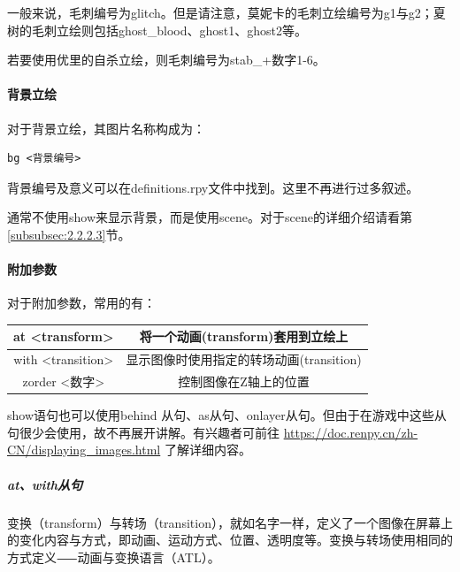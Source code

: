 \documentclass[../../Main.tex]{subfiles}
\begin{document}
一般来说，毛刺编号为glitch。但是请注意，莫妮卡的毛刺立绘编号为g1与g2；夏树的毛刺立绘则包括ghost\_blood、ghost1、ghost2等。

若要使用优里的自杀立绘，则毛刺编号为stab\_+数字1-6。

\paragraph{背景立绘}

对于背景立绘，其图片名称构成为：
\begin{lstlisting}
bg <背景编号>
\end{lstlisting}

背景编号及意义可以在definitions.rpy文件中找到。这里不再进行过多叙述。

\begin{ExtraKnowledge}
通常不使用show来显示背景，而是使用scene。对于scene的详细介绍请看第\ref{subsubsec:2.2.2.3}节。
\end{ExtraKnowledge}

\paragraph{附加参数}

对于附加参数，常用的有：
\begin{center}
    \tabletail{\hline}
    \tablelasttail{\hline}
    \begin{supertabular}{|c|c|}
        \hline
        at <transform> & 将一个动画(transform)套用到立绘上\\
        \hline
        with <transition> & 显示图像时使用指定的转场动画(transition)\\
        \hline
        zorder <数字> & 控制图像在Z轴上的位置\\
        \hline
    \end{supertabular}
\end{center}

\begin{ExtraKnowledge}
show语句也可以使用behind 从句、as从句、onlayer从句。但由于在游戏中这些从句很少会使用，故不再展开讲解。有兴趣者可前往 \url{https://doc.renpy.cn/zh-CN/displaying_images.html} 了解详细内容。
\end{ExtraKnowledge}

\subparagraph{at、with从句}
\label{subsubsec:2.2.2.1}

变换（transform）与转场（transition），就如名字一样，定义了一个图像在屏幕上的变化内容与方式，即动画、运动方式、位置、透明度等。变换与转场使用相同的方式定义⸺动画与变换语言（ATL）。
\end{document}
